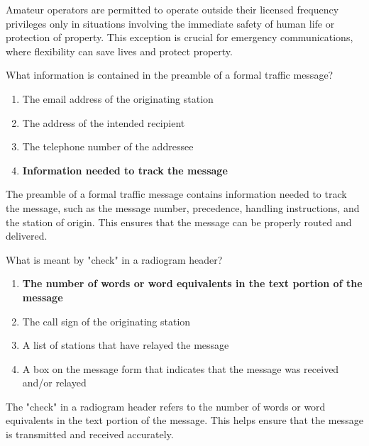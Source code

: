 Amateur operators are permitted to operate outside their licensed frequency privileges only in situations involving the immediate safety of human life or protection of property. This exception is crucial for emergency communications, where flexibility can save lives and protect property.


\begin{tcolorbox}[colback=gray!10!white,colframe=black!75!black,title={T2C10}]
    What information is contained in the preamble of a formal traffic message?
    \begin{enumerate}[label=\Alph*,noitemsep]
        \item The email address of the originating station
        \item The address of the intended recipient
        \item The telephone number of the addressee
        \item \textbf{Information needed to track the message}
    \end{enumerate}
\end{tcolorbox}

The preamble of a formal traffic message contains information needed to track the message, such as the message number, precedence, handling instructions, and the station of origin. This ensures that the message can be properly routed and delivered.


\begin{tcolorbox}[colback=gray!10!white,colframe=black!75!black,title={T2C11}]
    What is meant by "check" in a radiogram header?
    \begin{enumerate}[label=\Alph*,noitemsep]
        \item \textbf{The number of words or word equivalents in the text portion of the message}
        \item The call sign of the originating station
        \item A list of stations that have relayed the message
        \item A box on the message form that indicates that the message was received and/or relayed
    \end{enumerate}
\end{tcolorbox}

The "check" in a radiogram header refers to the number of words or word equivalents in the text portion of the message. This helps ensure that the message is transmitted and received accurately.

